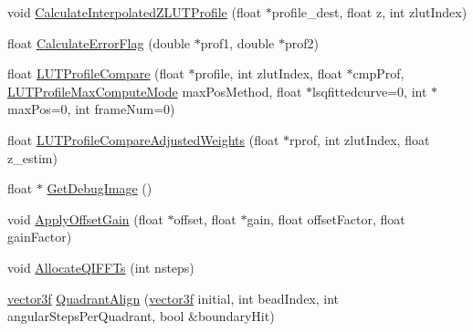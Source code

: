 \begin{DoxyCompactItemize}
\item 
void \hyperlink{class_c_p_u_tracker_a4ae169f9618eeb09f129815229eaeb33}{Calculate\+Interpolated\+Z\+L\+U\+T\+Profile} (float $\ast$profile\+\_\+dest, float z, int zlut\+Index)
\item 
float \hyperlink{class_c_p_u_tracker_a9222708c644ddeecbc2519ad8c1b4a2f}{Calculate\+Error\+Flag} (double $\ast$prof1, double $\ast$prof2)
\item 
float \hyperlink{class_c_p_u_tracker_a605758e0bf1f897f86f38b65e99e320b}{L\+U\+T\+Profile\+Compare} (float $\ast$profile, int zlut\+Index, float $\ast$cmp\+Prof, \hyperlink{class_c_p_u_tracker_a196ac690351a7a8449fe21012de9efdf}{L\+U\+T\+Profile\+Max\+Compute\+Mode} max\+Pos\+Method, float $\ast$lsqfittedcurve=0, int $\ast$max\+Pos=0, int frame\+Num=0)
\item 
float \hyperlink{class_c_p_u_tracker_ab915cca7e40b60f68f5e7d5c10386ddc}{L\+U\+T\+Profile\+Compare\+Adjusted\+Weights} (float $\ast$rprof, int zlut\+Index, float z\+\_\+estim)
\item 
float $\ast$ \hyperlink{class_c_p_u_tracker_ac0c9033626a30f3b8d1eccf02b7efa82}{Get\+Debug\+Image} ()
\item 
void \hyperlink{class_c_p_u_tracker_a97e9bde337abe501b108f5aac09c7db9}{Apply\+Offset\+Gain} (float $\ast$offset, float $\ast$gain, float offset\+Factor, float gain\+Factor)
\item 
void \hyperlink{class_c_p_u_tracker_aafcdd89f94bd04e92bf0fd228a59b1a5}{Allocate\+Q\+I\+F\+F\+Ts} (int nsteps)
\item 
\hyperlink{std__incl_8h_a2feaef1d85a74bd5cf80df91b1a9a914}{vector3f} \hyperlink{class_c_p_u_tracker_a7e9e0d809af103c8a24d6ecf09fdfb1c}{Quadrant\+Align} (\hyperlink{std__incl_8h_a2feaef1d85a74bd5cf80df91b1a9a914}{vector3f} initial, int bead\+Index, int angular\+Steps\+Per\+Quadrant, bool \&boundary\+Hit)
\end{DoxyCompactItemize}
